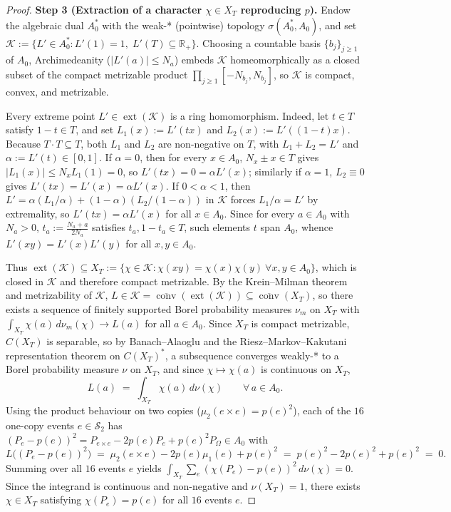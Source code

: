 \documentclass[11pt,a4paper]{article}
\theoremstyle{definition}
\theoremstyle{remark}
\DeclareMathOperator{\conv}{conv}
\DeclareMathOperator{\ext}{ext}
\begin{document}
\begin{proof}
\medskip\noindent\textbf{Step 3 (Extraction of a character $\chi \in X_T$ reproducing $p$).}
Endow the algebraic dual $A_0^*$ with the weak-* (pointwise) topology $\sigma(A_0^*, A_0)$, and set $\mathcal{K} := \{L' \in A_0^* : L'(1) = 1,\; L'(T) \subseteq \mathbb{R}_+\}$. Choosing a countable basis $\{b_j\}_{j \ge 1}$ of $A_0$, Archimedeanity ($|L'(a)| \le N_a$) embeds $\mathcal{K}$ homeomorphically as a closed subset of the compact metrizable product $\prod_{j \ge 1} [-N_{b_j}, N_{b_j}]$, so $\mathcal{K}$ is compact, convex, and metrizable.

Every extreme point $L' \in \ext(\mathcal{K})$ is a ring homomorphism. Indeed, let $t \in T$ satisfy $1 - t \in T$, and set $L_1(x) := L'(tx)$ and $L_2(x) := L'((1-t)x)$. Because $T \cdot T \subseteq T$, both $L_1$ and $L_2$ are non-negative on $T$, with $L_1 + L_2 = L'$ and $\alpha := L'(t) \in [0, 1]$. If $\alpha = 0$, then for every $x \in A_0$, $N_x \pm x \in T$ gives $|L_1(x)| \le N_x L_1(1) = 0$, so $L'(tx) = 0 = \alpha L'(x)$; similarly if $\alpha = 1$, $L_2 \equiv 0$ gives $L'(tx) = L'(x) = \alpha L'(x)$. If $0 < \alpha < 1$, then $L' = \alpha (L_1/\alpha) + (1-\alpha)(L_2/(1-\alpha))$ in $\mathcal{K}$ forces $L_1/\alpha = L'$ by extremality, so $L'(tx) = \alpha L'(x)$ for all $x \in A_0$. Since for every $a \in A_0$ with $N_a > 0$, $t_a := \frac{N_a + a}{2 N_a}$ satisfies $t_a, 1 - t_a \in T$, such elements $t$ span $A_0$, whence $L'(xy) = L'(x) L'(y)$ for all $x, y \in A_0$.

Thus $\ext(\mathcal{K}) \subseteq X_T := \{\chi \in \mathcal{K} : \chi(xy) = \chi(x)\chi(y)\ \forall x, y \in A_0\}$, which is closed in $\mathcal{K}$ and therefore compact metrizable. By the Krein--Milman theorem and metrizability of $\mathcal{K}$, $L \in \mathcal{K} = \overline{\conv}(\ext(\mathcal{K})) \subseteq \overline{\conv}(X_T)$, so there exists a sequence of finitely supported Borel probability measures $\nu_m$ on $X_T$ with $\int_{X_T} \chi(a)\, d\nu_m(\chi) \to L(a)$ for all $a \in A_0$. Since $X_T$ is compact metrizable, $C(X_T)$ is separable, so by Banach--Alaoglu and the Riesz--Markov--Kakutani representation theorem on $C(X_T)^*$, a subsequence converges weakly-* to a Borel probability measure $\nu$ on $X_T$, and since $\chi \mapsto \chi(a)$ is continuous on $X_T$,
\[
  L(a) \;=\; \int_{X_T} \chi(a)\, d\nu(\chi) \qquad \forall\, a \in A_0.
\]
Using the product behaviour on two copies ($\mu_2(e \times e) = p(e)^2$), each of the $16$ one-copy events $e \in \mathcal{S}_2$ has $(P_e - p(e))^2 = P_{e \times e} - 2 p(e) P_e + p(e)^2 P_\Omega \in A_0$ with
\[
  L\bigl((P_e - p(e))^2\bigr) \;=\; \mu_2(e \times e) - 2 p(e) \mu_1(e) + p(e)^2 \;=\; p(e)^2 - 2 p(e)^2 + p(e)^2 \;=\; 0.
\]
Summing over all $16$ events $e$ yields $\int_{X_T} \sum_e (\chi(P_e) - p(e))^2\, d\nu(\chi) = 0$. Since the integrand is continuous and non-negative and $\nu(X_T) = 1$, there exists $\chi \in X_T$ satisfying $\chi(P_e) = p(e)$ for all $16$ events $e$.


\end{proof}
\end{document}
